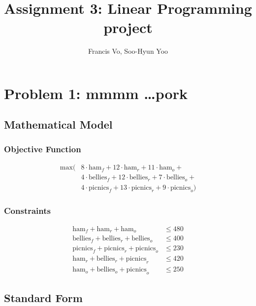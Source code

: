 \documentclass[letterpaper,10pt]{article}
\title{Assignment 3: Linear Programming project}
\author{Francis Vo, Soo-Hyun Yoo}
\begin{document}
	\maketitle

	\section{Problem 1: mmmm \dots pork}

	\subsection{Mathematical Model}
		\subsubsection{Objective Function}
			\begin{align*}
				\text{max} ( & 8\cdot\text{ham}_f + 12\cdot\text{ham}_r + 11\cdot\text{ham}_o + \\
							 & 4\cdot\text{bellies}_f + 12\cdot\text{bellies}_r + 7\cdot\text{bellies}_o + \\
							 & 4\cdot\text{picnics}_f + 13\cdot\text{picnics}_r + 9\cdot\text{picnics}_o )
			\end{align*}

		\subsubsection{Constraints}
			\begin{align*}
				\text{ham}_f + \text{ham}_r + \text{ham}_o             &\le 480 \\
				\text{bellies}_f + \text{bellies}_r + \text{bellies}_o &\le 400 \\
				\text{picnics}_f + \text{picnics}_r + \text{picnics}_o &\le 230 \\
				\text{ham}_r + \text{bellies}_r + \text{picnics}_r     &\le 420 \\
				\text{ham}_o + \text{bellies}_o + \text{picnics}_o     &\le 250
			\end{align*}


	\subsection{Standard Form}
\end{document}
